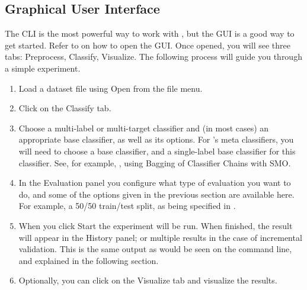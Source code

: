 \documentclass[11pt]{article}
\newcommand{\MEKA}{Meka}
\newcommand{\WEKA}{Weka}
\begin{document}
\subsection{Graphical User Interface}

The CLI is the most powerful way to work with \framework{\MEKA}, but the GUI is a good way to get started. Refer to  on how to open the GUI. Once opened, you will see three tabs: \textsf{Preprocess}, \textsf{Classify}, \textsf{Visualize}. The following process will guide you through a simple experiment.




\begin{enumerate}
	\item Load a dataset file using \textsf{Open} from the file menu. %
	\item Click on the \textsf{Classify} tab.
	\item \textsf{Choose} a multi-label or multi-target classifier and (in most cases) an appropriate \framework{\WEKA} base classifier, as well as its options. For \framework{\MEKA}'s meta classifiers, you will need to choose a \framework{\MEKA} base classifier, and a single-label \framework{\WEKA} base classifier for this classifier. See, for example, , using Bagging of Classifier Chains with SMO.
	\item In the \textsf{Evaluation} panel you configure what type of evaluation you want to do, and some of the options given in the previous section are available here. For example, a 50/50 train/test split, as being specified in .
	\item When you click \textsf{Start} the experiment will be run. When finished, the result will appear in the \textsf{History} panel; or multiple results in the case of incremental validation. This is the same output as would be seen on the command line, and explained in the following section.
	\item Optionally, you can click on the \textsf{Visualize} tab and visualize the results.
\end{enumerate}
\end{document}
